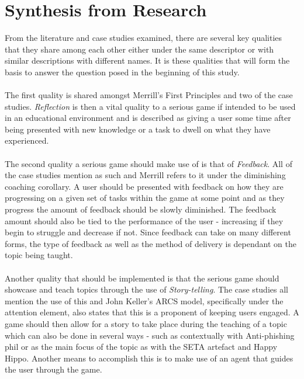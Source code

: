 \documentclass[conference]{IEEEtran}
\begin{document}
\section{Synthesis from Research}
From the literature and case studies examined, there are several key qualities that they share among each other either under the same descriptor or with similar descriptions with different names. It is these qualities that will form the basis to answer the question posed in the beginning of this study.
\\\\
The first quality is shared amongst Merrill's First Principles\cite{Merrill2002} and two of the case studies\cite{Dincelli2020,Sheng2007}. \textit{Reflection} is then a vital quality to a serious game if intended to be used in an educational environment and is described as giving a user some time after being presented with new knowledge or a task to dwell on what they have experienced.
\\\\
The second quality a serious game should make use of is that of \textit{Feedback}. All of the case studies\cite{Dincelli2020,Sheng2007,allers2021children} mention as such and Merrill\cite{Merrill2002} refers to it under the diminishing coaching corollary. A user should be presented with feedback on how they are progressing on a given set of tasks within the game at some point and as they progress the amount of feedback should be slowly diminished. The feedback amount should also be tied to the performance of the user - increasing if they begin to struggle and decrease if not. Since feedback can take on many different forms, the type of feedback as well as the method of delivery is dependant on the topic being taught.
\\\\
Another quality that should be implemented is that the serious game should showcase and teach topics through the use of \textit{Story-telling}. The case studies\cite{Dincelli2020,Sheng2007,allers2021children} all mention the use of this and John Keller's ARCS model\cite{keller1987development}, specifically under the attention element, also states that this is a proponent of keeping users engaged. A game should then allow for a story to take place during the teaching of a topic which can also be done in several ways - such as contextually with Anti-phishing phil or as the main focus of the topic as with the SETA artefact\cite{Dincelli2020} and Happy Hippo\cite{allers2021children}. Another means to accomplish this is to make use of an agent that guides the user through the game. 
\\\\
\end{document}
